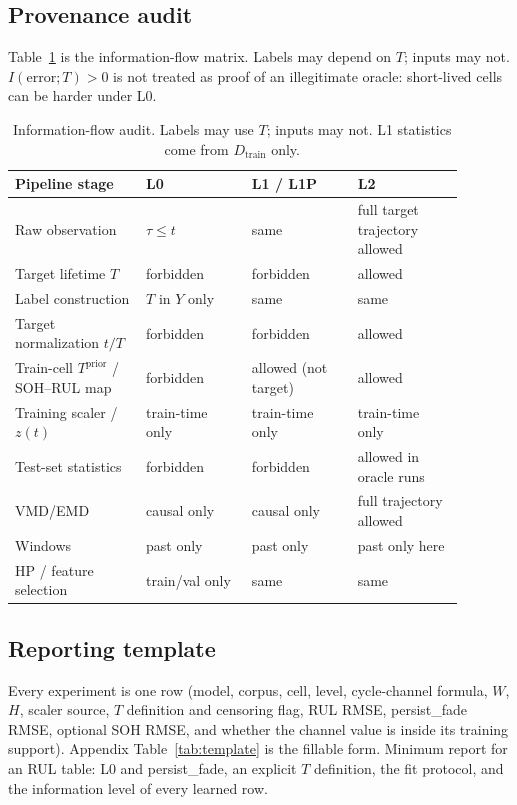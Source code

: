 \documentclass[preprint,12pt]{elsarticle}
\begin{document}
\subsection{Provenance audit}
\label{sec:audit}

Table~\ref{tab:provenance} is the information-flow matrix.
Labels may depend on $T$; inputs may not.
$I(\mathrm{error};T)>0$ is not treated as proof of an illegitimate oracle: short-lived cells can be harder under L0.

\begin{table}[htbp]
\centering
\caption{Information-flow audit. Labels may use $T$; inputs may not. L1 statistics come from $D_{\mathrm{train}}$ only.}
\label{tab:provenance}
\begin{tabular}{@{}p{0.26\linewidth}p{0.21\linewidth}p{0.21\linewidth}p{0.21\linewidth}@{}}
\toprule
Pipeline stage & L0 & L1 / L1P & L2 \\
\midrule
Raw observation & $\tau\le t$ & same & full target trajectory allowed \\
Target lifetime $T$ & forbidden & forbidden & allowed \\
Label construction & $T$ in $Y$ only & same & same \\
Target normalization $t/T$ & forbidden & forbidden & allowed \\
Train-cell $T^{\mathrm{prior}}$ / SOH--RUL map & forbidden & allowed (not target) & allowed \\
Training scaler / $z(t)$ & train-time only & train-time only & train-time only \\
Test-set statistics & forbidden & forbidden & allowed in oracle runs \\
VMD/EMD & causal only & causal only & full trajectory allowed \\
Windows & past only & past only & past only here \\
HP / feature selection & train/val only & same & same \\
\bottomrule
\end{tabular}
\end{table}

\subsection{Reporting template}
\label{sec:template}

Every experiment is one row
(model, corpus, cell, level, cycle-channel formula, $W$, $H$, scaler source, $T$ definition and censoring flag, RUL RMSE, persist\_fade RMSE, optional SOH RMSE, and whether the channel value is inside its training support).
Appendix Table~\ref{tab:template} is the fillable form.
Minimum report for an RUL table: L0 and persist\_fade, an explicit $T$ definition, the fit protocol, and the information level of every learned row.
\end{document}
